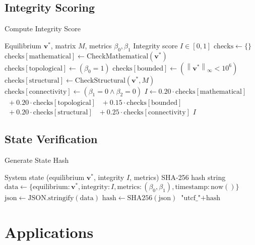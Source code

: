 \documentclass[11pt,a4paper]{article}
\theoremstyle{definition}
\theoremstyle{remark}
\newcommand{\norm}[1]{\left\|#1\right\|}
\begin{document}
\subsection{Integrity Scoring}

\begin{algorithm}
\caption{Compute Integrity Score}\label{alg:integrity}
\begin{algorithmic}[1]
\Require Equilibrium $\mathbf{v}^*$, matrix $M$, metrics $\beta_0, \beta_1$
\Ensure Integrity score $I \in [0, 1]$
\State $\text{checks} \gets \{\}$
\State $\text{checks}[\text{mathematical}] \gets \text{CheckMathematical}(\mathbf{v}^*)$
\State $\text{checks}[\text{topological}] \gets (\beta_0 = 1)$
\State $\text{checks}[\text{bounded}] \gets (\norm{\mathbf{v}^*}_\infty < 10^6)$
\State $\text{checks}[\text{structural}] \gets \text{CheckStructural}(\mathbf{v}^*, M)$
\State $\text{checks}[\text{connectivity}] \gets (\beta_1 = 0 \land \beta_2 = 0)$
\State $I \gets 0.20 \cdot \text{checks}[\text{mathematical}]$
\State $\phantom{I} + 0.20 \cdot \text{checks}[\text{topological}]$
\State $\phantom{I} + 0.15 \cdot \text{checks}[\text{bounded}]$
\State $\phantom{I} + 0.20 \cdot \text{checks}[\text{structural}]$
\State $\phantom{I} + 0.25 \cdot \text{checks}[\text{connectivity}]$
\State \Return $I$
\end{algorithmic}
\end{algorithm}

\subsection{State Verification}

\begin{algorithm}
\caption{Generate State Hash}\label{alg:hash}
\begin{algorithmic}[1]
\Require System state (equilibrium $\mathbf{v}^*$, integrity $I$, metrics)
\Ensure SHA-256 hash string
\State $\text{data} \gets \{\text{equilibrium}: \mathbf{v}^*, \text{integrity}: I, \text{metrics}: (\beta_0, \beta_1), \text{timestamp}: \text{now}()\}$
\State $\text{json} \gets \text{JSON.stringify}(\text{data})$
\State $\text{hash} \gets \text{SHA256}(\text{json})$
\State \Return $\text{"utcf\_"} + \text{hash}$
\end{algorithmic}
\end{algorithm}

\section{Applications}
\end{document}
